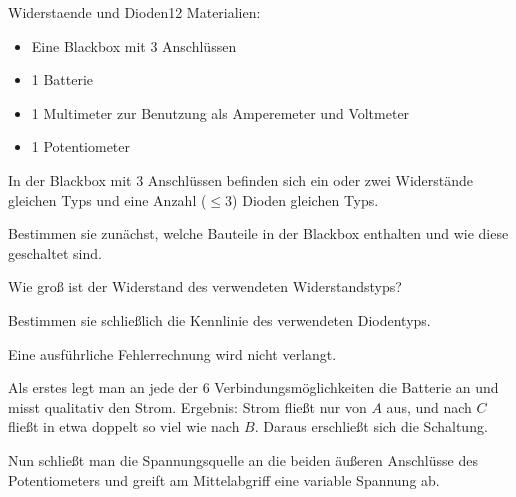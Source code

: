 \begin{problem}{Widerstaende und Dioden}{12}
Materialien:
\begin{itemize}
\item Eine Blackbox mit 3 Anschlüssen
\item 1 Batterie
\item 1 Multimeter zur Benutzung als Amperemeter und Voltmeter
\item 1 Potentiometer
\end{itemize}
In der Blackbox mit 3 Anschlüssen befinden sich ein oder zwei Widerstände gleichen Typs und eine Anzahl ($\leq 3$) Dioden gleichen Typs.
\begin{abcenum}
\item Bestimmen sie zunächst, welche Bauteile in der Blackbox enthalten und wie diese geschaltet sind.
\item Wie groß ist der Widerstand des verwendeten Widerstandstyps?
\item Bestimmen sie schließlich die Kennlinie des verwendeten Diodentyps.
\end{abcenum}
Eine ausführliche Fehlerrechnung wird nicht verlangt.
\begin{expsolution}
Als erstes legt man an jede der 6 Verbindungsmöglichkeiten die Batterie an und misst qualitativ den Strom. Ergebnis: Strom fließt nur von $A$ aus, und nach $C$ fließt in etwa doppelt so viel wie nach $B$. Daraus erschließt sich die Schaltung.

Nun schließt man die Spannungsquelle an die beiden äußeren Anschlüsse des Potentiometers und greift am Mittelabgriff eine variable Spannung ab.\\


\end{expsolution}
\end{problem}
